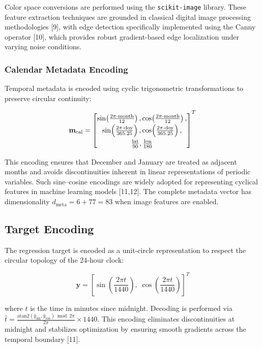 \documentclass[9pt, a4paper, twocolumn]{article}
\begin{document}
Color space conversions are performed using the \texttt{scikit-image} library. These feature extraction techniques are grounded in classical digital image processing methodologies [9], with edge detection specifically implemented using the Canny operator [10], which provides robust gradient-based edge localization under varying noise conditions.

\subsubsection{Calendar Metadata Encoding}

Temporal metadata is encoded using cyclic trigonometric transformations to preserve circular continuity:

\begin{equation}
{
\renewcommand{\arraystretch}{1.4}
\mathbf{m}_{\text{cal}} =
\begin{bmatrix}
\sin\!\left(\frac{2\pi \cdot \text{month}}{12}\right),
\cos\!\left(\frac{2\pi \cdot \text{month}}{12}\right), \\
\sin\!\left(\frac{2\pi \cdot \text{doy}}{365.25}\right),
\cos\!\left(\frac{2\pi \cdot \text{doy}}{365.25}\right), \\
\frac{\text{lat}}{90},
\frac{\text{lon}}{180}
\end{bmatrix}^T
}
\end{equation}

This encoding ensures that December and January are treated as adjacent months and avoids discontinuities inherent in linear representations of periodic variables. Such sine–cosine encodings are widely adopted for representing cyclical features in machine learning models [11,12]. The complete metadata vector has dimensionality $d_{\text{meta}} = 6 + 77 = 83$ when image features are enabled.

\subsection{Target Encoding}

The regression target is encoded as a unit-circle representation to respect the circular topology of the 24-hour clock:

\begin{equation}
\mathbf{y} = \left[\sin\!\left(\frac{2\pi t}{1440}\right),\;
\cos\!\left(\frac{2\pi t}{1440}\right)\right]^T
\end{equation}

where $t$ is the time in minutes since midnight. Decoding is performed via $\hat{t} = \frac{\text{atan2}(\hat{y}_{\sin}, \hat{y}_{\cos}) \bmod 2\pi}{2\pi} \times 1440$. This encoding eliminates discontinuities at midnight and stabilizes optimization by ensuring smooth gradients across the temporal boundary [11].
\end{document}
